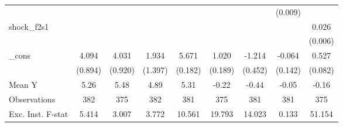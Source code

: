 {\begin{tabular}{l*{8}{c}}
            &                     &                     &                     &                     &                     &                     &     (0.009)         &                     \\
\addlinespace
shock\_f2s1  &                     &                     &                     &                     &                     &                     &                     &       0.026\sym{***}\\
            &                     &                     &                     &                     &                     &                     &                     &     (0.006)         \\
\addlinespace
\_cons      &       4.094\sym{***}&       4.031\sym{***}&       1.934         &       5.671\sym{***}&       1.020\sym{***}&      -1.214\sym{**} &      -0.064         &       0.527\sym{***}\\
            &     (0.894)         &     (0.920)         &     (1.397)         &     (0.182)         &     (0.189)         &     (0.452)         &     (0.142)         &     (0.082)         \\
\midrule
Mean Y      &        5.26         &        5.48         &        4.89         &        5.31         &       -0.22         &       -0.44         &       -0.05         &       -0.16         \\
Observations&         382         &         375         &         382         &         381         &         375         &         381         &         381         &         375         \\
Exc. Inst. F-stat&       5.414         &       3.007         &       3.772         &      10.561         &      19.793         &      14.023         &       0.133         &      51.154         \\
\bottomrule
\end{tabular}
}
